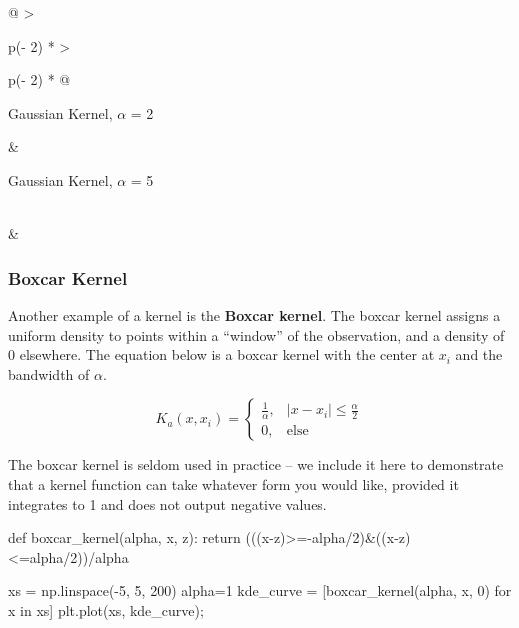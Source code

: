\documentclass[
  letterpaper,
  DIV=11,
  numbers=noendperiod]{scrreprt}
\newenvironment{Shaded}{\begin{snugshade}}{\end{snugshade}}
\newcommand{\ControlFlowTok}[1]{\textcolor[rgb]{0.00,0.23,0.31}{#1}}
\newcommand{\DecValTok}[1]{\textcolor[rgb]{0.68,0.00,0.00}{#1}}
\newcommand{\KeywordTok}[1]{\textcolor[rgb]{0.00,0.23,0.31}{#1}}
\newcommand{\NormalTok}[1]{\textcolor[rgb]{0.00,0.23,0.31}{#1}}
\newcommand{\OperatorTok}[1]{\textcolor[rgb]{0.37,0.37,0.37}{#1}}
\begin{document}
\begin{longtable}[]{@{}
  >{\raggedright\arraybackslash}p{(\columnwidth - 2\tabcolsep) * }
  >{\raggedright\arraybackslash}p{(\columnwidth - 2\tabcolsep) * }@{}}
\toprule\noalign{}
\begin{minipage}[b]{\linewidth}\raggedright
Gaussian Kernel, \(\alpha\) = 2
\end{minipage} & \begin{minipage}[b]{\linewidth}\raggedright
Gaussian Kernel, \(\alpha\) = 5
\end{minipage} \\
\midrule\noalign{}
\endhead
\bottomrule\noalign{}
\endlastfoot
& \\
\end{longtable}

\subsubsection{Boxcar Kernel}\label{boxcar-kernel}

Another example of a kernel is the \textbf{Boxcar kernel}. The boxcar
kernel assigns a uniform density to points within a ``window'' of the
observation, and a density of 0 elsewhere. The equation below is a
boxcar kernel with the center at \(x_i\) and the bandwidth of
\(\alpha\).

\[K_a(x, x_i) = \begin{cases}
        \frac{1}{\alpha}, & |x - x_i| \le \frac{\alpha}{2}\\
        0, & \text{else }
    \end{cases}\]

The boxcar kernel is seldom used in practice -- we include it here to
demonstrate that a kernel function can take whatever form you would
like, provided it integrates to 1 and does not output negative values.

\begin{Shaded}
\begin{Highlighting}[]
\KeywordTok{def}\NormalTok{ boxcar\_kernel(alpha, x, z):}
    \ControlFlowTok{return}\NormalTok{ (((x}\OperatorTok{{-}}\NormalTok{z)}\OperatorTok{\textgreater{}={-}}\NormalTok{alpha}\OperatorTok{/}\DecValTok{2}\NormalTok{)}\OperatorTok{\&}\NormalTok{((x}\OperatorTok{{-}}\NormalTok{z)}\OperatorTok{\textless{}=}\NormalTok{alpha}\OperatorTok{/}\DecValTok{2}\NormalTok{))}\OperatorTok{/}\NormalTok{alpha}

\NormalTok{xs }\OperatorTok{=}\NormalTok{ np.linspace(}\OperatorTok{{-}}\DecValTok{5}\NormalTok{, }\DecValTok{5}\NormalTok{, }\DecValTok{200}\NormalTok{)}
\NormalTok{alpha}\OperatorTok{=}\DecValTok{1}
\NormalTok{kde\_curve }\OperatorTok{=}\NormalTok{ [boxcar\_kernel(alpha, x, }\DecValTok{0}\NormalTok{) }\ControlFlowTok{for}\NormalTok{ x }\KeywordTok{in}\NormalTok{ xs]}
\NormalTok{plt.plot(xs, kde\_curve)}\OperatorTok{;}
\end{Highlighting}
\end{Shaded}
\end{document}
